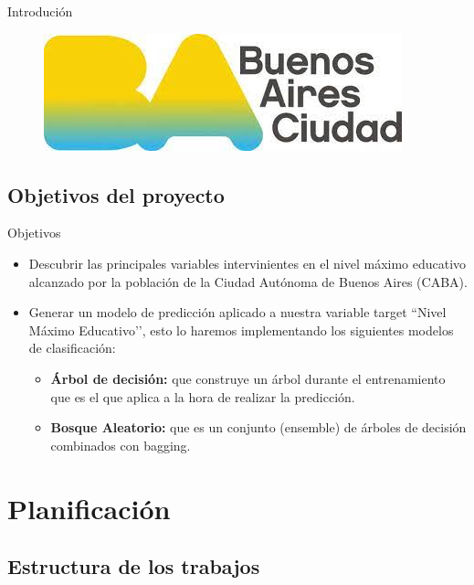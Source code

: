 \documentclass[pdf]{beamer}
\begin{document}
\begin{frame}{Introdución}
\begin{itemize}
            \end{itemize}

   \begin{figure}
        \includegraphics[scale=0.3]{../Informe/Imagenes/GobCiuBsAs.jpg}
    \end{figure}

\end{frame}

    \subsection{Objetivos del proyecto}

\begin{frame}{Objetivos}

    \begin{itemize}
        \justifying
        \item Descubrir las principales variables intervinientes en el nivel máximo educativo alcanzado por la población de la Ciudad Autónoma de Buenos Aires (CABA).
        \item Generar un modelo de predicción aplicado a nuestra variable target ``Nivel Máximo Educativo’’, esto lo haremos implementando los siguientes modelos de clasificación:
        \begin{itemize}
            \justifying
            \item \textbf{Árbol de decisión:} que construye un árbol durante el entrenamiento que es el que aplica a la hora de realizar la predicción.
            \item \textbf{Bosque Aleatorio:} que es un conjunto (ensemble) de árboles de decisión combinados con bagging.
        \end{itemize}
    \end{itemize}

\end{frame}

\section{Planificación}

    \subsection*{Estructura de los trabajos}
\end{document}
